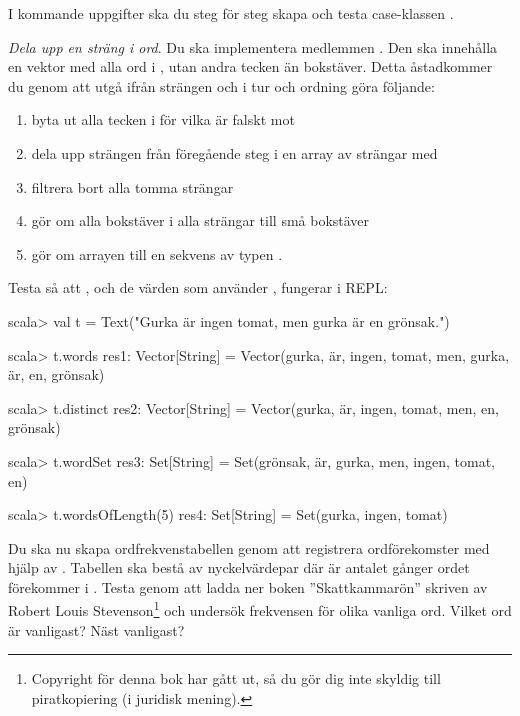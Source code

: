 \noindent I kommande uppgifter ska du steg för steg skapa och testa case-klassen . %

\begin{figure}[H]
\end{figure}





\Task \emph{Dela upp en sträng i ord}. Du ska implementera medlemmen . Den ska innehålla en vektor med alla ord i , utan andra tecken än bokstäver.
Detta åstadkommer du genom att utgå ifrån strängen  och i tur och ordning göra följande:
\begin{enumerate}%
\item byta ut alla tecken i  för vilka  är falskt mot 
\item dela upp strängen från föregående steg i en array av strängar med 
\item filtrera bort alla tomma strängar
\item gör om alla bokstäver i alla strängar till små bokstäver
\item gör om arrayen till en sekvens av typen .
\end{enumerate}

\noindent Testa så att , och de värden som använder , fungerar i REPL:
\begin{REPL}
scala> val t = Text("Gurka är ingen tomat, men gurka är en grönsak.")

scala> t.words
res1: Vector[String] =
  Vector(gurka, är, ingen, tomat, men, gurka, är, en, grönsak)

scala> t.distinct
res2: Vector[String] =
  Vector(gurka, är, ingen, tomat, men, en, grönsak)

scala> t.wordSet
res3: Set[String] = Set(grönsak, är, gurka, men, ingen, tomat, en)

scala> t.wordsOfLength(5)
res4: Set[String] = Set(gurka, ingen, tomat)

\end{REPL}



\Task Du ska nu skapa ordfrekvenstabellen  genom att registrera ordförekomster med hjälp av . Tabellen  ska bestå av nyckelvärdepar  där  är antalet gånger ordet  förekommer i . Testa  genom att ladda ner boken ''Skattkammarön'' skriven av Robert Louis Stevenson\footnote{Copyright för denna bok har gått ut, så du gör dig inte skyldig till piratkopiering (i juridisk mening).} och undersök frekvensen för olika vanliga ord. Vilket ord är vanligast? Näst vanligast?

